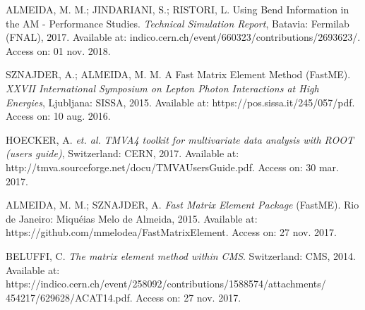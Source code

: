 \begin{thebibliography}{}
ALMEIDA, M. M.; JINDARIANI, S.; RISTORI, L. Using Bend Information in the AM - Performance Studies. \textit{Technical Simulation Report}, Batavia: Fermilab (FNAL), 2017. Available at: indico.cern.ch/event/660323/contributions/2693623/. Access on: 01 nov. 2018.
	
SZNAJDER, A.; ALMEIDA, M. M. A Fast Matrix Element Method (FastME). \textit{XXVII International Symposium on Lepton Photon Interactions at High Energies}, Ljubljana: SISSA, 2015. Available at: https://pos.sissa.it/245/057/pdf. Access on: 10 aug. 2016.

HOECKER, A.  \textit{et. al.} \textit{TMVA4 toolkit for multivariate data analysis with ROOT (users guide)}, Switzerland: CERN, 2017. Available at: http://tmva.sourceforge.net/docu/TMVAUsersGuide.pdf. Access on: 30 mar. 2017.


ALMEIDA, M. M.; SZNAJDER, A. \textit{Fast Matrix Element Package} (FastME). Rio de Janeiro: Miquéias Melo de Almeida, 2015. Available at: https://github.com/mmelodea/FastMatrixElement. Access on: 27 nov. 2017.

BELUFFI, C. \textit{The matrix element method within CMS}. Switzerland: CMS, 2014. Available at: https://indico.cern.ch/event/258092/contributions/1588574/attachments/ 454217/629628/ACAT14.pdf. Access on: 27 nov. 2017.

\end{thebibliography}
